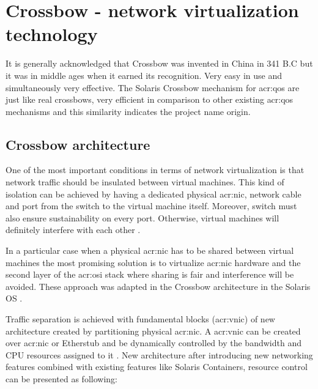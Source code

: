 \documentclass[11pt]{book}
\begin{document}
    \section{Crossbow - network virtualization technology}
    \label{sec:sol:xbow}


      It is generally acknowledged that Crossbow was invented in China in 341 B.C but it was in middle ages when it
      earned its recognition. Very easy in use and simultaneously very effective. The Solaris Crossbow mechanism for
      \gls{acr:qos} are just like real crossbows, very efficient in comparison to other existing \gls{acr:qos}
      mechanisms and this similarity indicates the project name origin.


      \subsection{Crossbow architecture}

        One of the most important conditions in terms of network virtualization is that network traffic should be
        insulated between virtual machines. This kind of isolation can be achieved by having a dedicated physical
        \gls{acr:nic}, network cable and port from the switch to the virtual machine itself. Moreover, switch must also
        ensure sustainability on every port. Otherwise, virtual machines will definitely interfere with each other
        \cite{crossbow}.
        
        In a particular case when a physical \gls{acr:nic} has to be shared between virtual machines the most promising
        solution is to virtualize \gls{acr:nic} hardware and the second layer of the \gls{acr:osi} stack where sharing
        is fair and interference will be avoided. These approach was adapted in the Crossbow architecture in the Solaris
        OS \cite{crossbow}.
        
        Traffic separation is achieved with fundamental blocks (\gls{acr:vnic}) of new architecture created by
        partitioning physical \gls{acr:nic}. A \gls{acr:vnic} can be created over \gls{acr:nic} or Etherstub and be
        dynamically controlled by the bandwidth and CPU resources assigned to it \cite{crossbow,network_virtualization}.
        New architecture after introducing new networking features combined with existing features like Solaris
        Containers, resource control can be presented as following:
\end{document}
